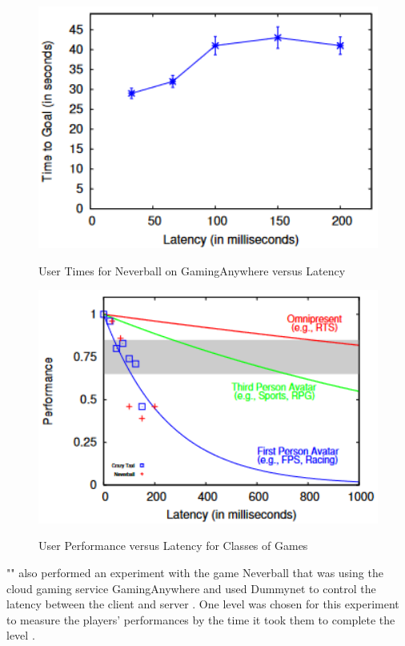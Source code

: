 \begin{figure}[H]
	\centering
	\includegraphics[width=12cm]{../img/fig23.png}
	\caption{User Times for Neverball on GamingAnywhere versus Latency}
	\parencite[Chapter 4, Figure 7]{claypool2014effects}
\end{figure}
\begin{figure}[H]
	\centering
	\includegraphics[width=12cm]{../img/fig24.png}
	\caption{User Performance versus Latency for Classes of Games}
	\parencite[Chapter 4, Figure 8]{claypool2014effects}
\end{figure}
"\textcite{anouna2014network}" also performed an experiment with the game Neverball that was using the cloud gaming service GamingAnywhere and used Dummynet to control the latency between the client and server \parencite[Section 3.2, Page 6]{anouna2014network}. One level was chosen for this experiment to measure the players' performances by the time it took them to complete the level \parencite[Section 4.1, Page 15]{anouna2014network}.
